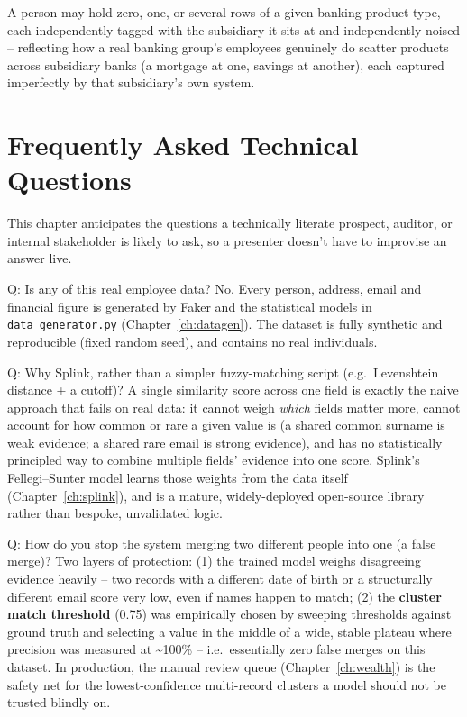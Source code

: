\documentclass[11pt]{report}
\begin{document}
\begin{engbox}
A person may hold zero, one, or several rows of a given banking-product type, each independently tagged with the subsidiary it sits at and independently noised -- reflecting how a real banking group's employees genuinely do scatter products across subsidiary banks (a mortgage at one, savings at another), each captured imperfectly by that subsidiary's own system.
\end{engbox}

\chapter{Frequently Asked Technical Questions}
\label{ch:faq}

This chapter anticipates the questions a technically literate prospect, auditor, or internal stakeholder is likely to ask, so a presenter doesn't have to improvise an answer live.

\begin{qabox}{Q: Is any of this real employee data?}
No. Every person, address, email and financial figure is generated by Faker and the statistical models in \texttt{data\_generator.py} (Chapter~\ref{ch:datagen}). The dataset is fully synthetic and reproducible (fixed random seed), and contains no real individuals.
\end{qabox}

\begin{qabox}{Q: Why Splink, rather than a simpler fuzzy-matching script (e.g.\ Levenshtein distance + a cutoff)?}
A single similarity score across one field is exactly the naive approach that fails on real data: it cannot weigh \emph{which} fields matter more, cannot account for how common or rare a given value is (a shared common surname is weak evidence; a shared rare email is strong evidence), and has no statistically principled way to combine multiple fields' evidence into one score. Splink's Fellegi--Sunter model learns those weights from the data itself (Chapter~\ref{ch:splink}), and is a mature, widely-deployed open-source library rather than bespoke, unvalidated logic.
\end{qabox}

\begin{qabox}{Q: How do you stop the system merging two different people into one (a false merge)?}
Two layers of protection: (1) the trained model weighs disagreeing evidence heavily -- two records with a different date of birth or a structurally different email score very low, even if names happen to match; (2) the \textbf{cluster match threshold} (0.75) was empirically chosen by sweeping thresholds against ground truth and selecting a value in the middle of a wide, stable plateau where precision was measured at \textasciitilde100\% -- i.e.\ essentially zero false merges on this dataset. In production, the manual review queue (Chapter~\ref{ch:wealth}) is the safety net for the lowest-confidence multi-record clusters a model should not be trusted blindly on.
\end{qabox}
\end{document}
